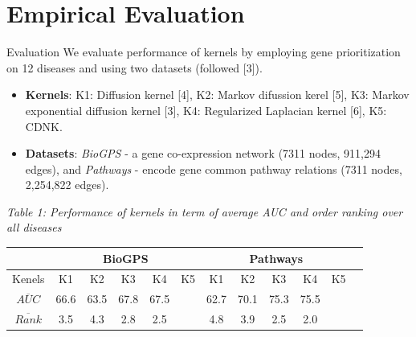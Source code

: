 \documentclass{beamer}
\begin{document}
\section{Empirical Evaluation}
\vspace{-1cm}
\begin{frame}[t]{Evaluation}
\small
We evaluate performance of kernels by employing gene prioritization on 12 diseases and using two datasets (followed [3]).
\begin{itemize}
	\item \textbf{Kernels}: K1: Diffusion kernel [4], K2: Markov difussion kerel [5], K3: Markov exponential diffusion kernel [3], K4: Regularized Laplacian kernel [6], K5: CDNK.
	\item \textbf{Datasets}: \textit{BioGPS} - a gene co-expression network (7311 nodes, 911,294 edges), and \textit{Pathways} - encode gene common pathway relations (7311 nodes, 2,254,822 edges). 
\end{itemize}

\textit{Table 1: Performance of kernels in term of average AUC and order ranking over all diseases}
\begin{center}
\setlength{\tabcolsep}{1mm}
\begin{tabular}{|c|c|c|c|c|c|c|c|c|c|c|c|}
	\hline 
		& \multicolumn{5}{c|}{\textbf{BioGPS}} & \multicolumn{5}{|c|}{\textbf{Pathways}} \\
	\hline
	Kenels & K1 & K2 & K3 & K4 & K5 & K1 & K2 & K3 & K4 & K5 \\ [0.6ex]
	\hline 
	$\overline{AUC}$ & 66.6 & 63.5 & 67.8 & 67.5 & \color{red}{73.3} & 62.7 & 70.1 & 75.3 & 75.5 & \color{red}{76.5} \\ [0.8ex]
	\hline
	$\overline{Rank}$ & 3.5 & 4.3 & 2.8 & 2.5 & \color{red}{2.0} & 4.8 & 3.9 & 2.5 & 2.0 & \color{red}{1.8} \\
	\hline 
\end{tabular}
\end{center}
\end{frame}
\end{document}
